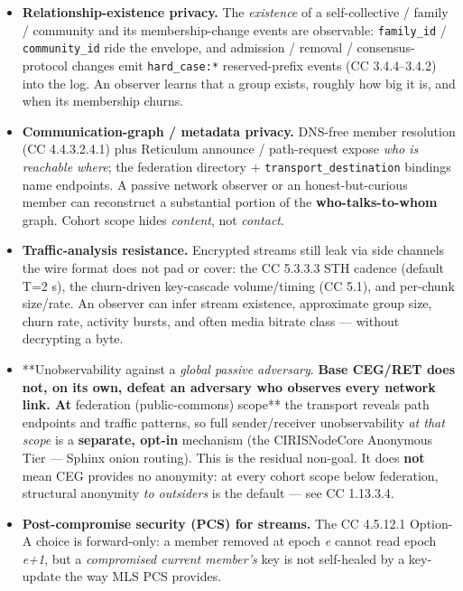 \documentclass[11pt]{article}
\begin{document}
\begin{itemize}\setlength\itemsep{0pt}
\item \textbf{Relationship-existence privacy.} The \textit{existence} of a self-collective / family / community and its membership-change events are observable: \texttt{family\_id} / \texttt{community\_id} ride the envelope, and admission / removal / consensus-protocol changes emit \texttt{hard\_case:*} reserved-prefix events (CC 3.4.4–3.4.2) into the log. An observer learns that a group exists, roughly how big it is, and when its membership churns.
\item \textbf{Communication-graph / metadata privacy.} DNS-free member resolution (CC 4.4.3.2.4.1) plus Reticulum announce / path-request expose \textit{who is reachable where}; the federation directory + \texttt{transport\_destination} bindings name endpoints. A passive network observer or an honest-but-curious member can reconstruct a substantial portion of the \textbf{who-talks-to-whom} graph. Cohort scope hides \textit{content}, not \textit{contact}.
\item \textbf{Traffic-analysis resistance.} Encrypted streams still leak via side channels the wire format does not pad or cover: the CC 5.3.3.3 STH cadence (default T=2 s), the churn-driven key-cascade volume/timing (CC 5.1), and per-chunk size/rate. An observer can infer stream existence, approximate group size, churn rate, activity bursts, and often media bitrate class — without decrypting a byte.
\item **Unobservability against a \textit{global passive adversary}.\textbf{ Base CEG/RET does not, on its own, defeat an adversary who observes every network link. At }federation (public-commons) scope** the transport reveals path endpoints and traffic patterns, so full sender/receiver unobservability \textit{at that scope} is a \textbf{separate, opt-in} mechanism (the CIRISNodeCore Anonymous Tier — Sphinx onion routing). This is the residual non-goal. It does \textbf{not} mean CEG provides no anonymity: at every cohort scope below federation, structural anonymity \textit{to outsiders} is the default — see CC 1.13.3.4.
\item \textbf{Post-compromise security (PCS) for streams.} The CC 4.5.12.1 Option-A choice is forward-only: a member removed at epoch \textit{e} cannot read epoch \textit{e+1}, but a \textit{compromised current member's} key is not self-healed by a key-update the way MLS PCS provides.
\end{itemize}
\end{document}
